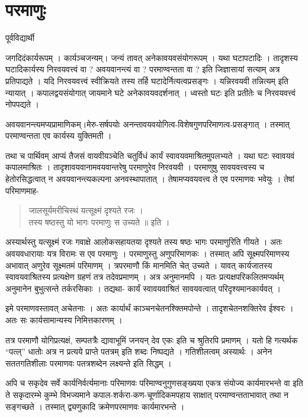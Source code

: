 {\fontsize{15}{17}\selectfont
\chapter{परमाणुः}

\begin{center}
\smallskip
पूर्वविद्यार्थी
\addrule
\end{center}
जगदिदंकार्यरूपम् । कार्यञ्चजन्यम्। जन्यं तावत् अनेकावयवसंयोगरूपम् । यथा घटापटादिः । तादृशस्य घटादिकार्यस्य निरवयवत्त्वं वा ? अवयवानन्त्यं वा ? परमाण्वन्तता वा ? इति जिज्ञासायां सत्याम् अत्र प्रतिपाद्यते । यदि निरवयवत्त्वं स्वीक्रियते तस्य तर्हि घटादेर्नित्यत्वप्रसङ्गः । यन्निरवयवी तन्नित्यम् इति न्यायात् । कपालद्वयसंयोगात् जायमाने घटे अनेकावयवदर्शनात् । ध्वस्तो घटः इति प्रतीतेः च निरवयवत्त्वं नोपपद्यते ।

अवयवानन्त्यमप्यप्रामाणिकम्।मेरु-सर्षपयोः अनन्तावयवयोगित्व-विशेषगुणपरिमाणत्व-प्रसङ्गात् । तस्मात् परमाण्वन्तता एव कार्यस्य युक्तिमती ।

तथा च पार्थिवम् आप्यं तैजसं वायवीयञ्चेति चतुर्विधं कार्यं स्वावयवमाश्रितमुपलभ्यते । यथा घटः स्वावयवं कपालमाश्रितः । तादृशावयवानामवयवान्तरेषु परमाणुरेव निरवयवी । परमाणुषु सावयवत्त्वस्य च हेतोरसिद्धत्वात् न अवयवानन्त्यकल्पना अनवस्थापातात् । तेषामप्यवयवत्त्व ते एव परमाणवः भवेयुः । तेषां परिमाणमाह-
\begin{verse}
जालसूर्यमरीचिस्थं यत्सूक्ष्मं दृश्यते रजः ।\\
तस्य षष्ठस्तु यो भागः परमाणुः स उच्यते ॥ इति ।
\end{verse}
अस्यार्थस्तु यत्सूक्ष्मं रजः गवाक्षे आलोकसहायतया दृश्यते तस्य षष्ठः भागः परमाणुरिति गीयते । अतः अवयवधारायाः यत्र विरामः स एव परमाणुः । परमाणुस्तु अणुपरिमाणकः । तस्मात् अपि सूक्ष्मपरिमाणस्य अभावात् अणुरेव सूक्ष्मतमं परिमाणम् । त्रपरमाणौ किं मानमिति चेत् उच्यते । यावत् कार्यजातस्य स्वावयवाश्रितस्य प्रत्यक्षेण ग्रहणं तत्र तदेवप्रमाणम् । अत्र अनुमानमपि । यतः प्रत्यक्षपरिकलितमप्यर्थम् अनुमानेन बुभुत्सन्ते तर्करसिकाः । तद्यथा- कार्यं स्वावयवाश्रितं सावयवत्वात् परिदृश्यमानकार्यवत् ।

इमे परमाणवस्तावत् अचेतनाः । अतः कार्यार्थं काञ्चनचेतनश्क्तिमपोन्ते । तादृशचेतनशक्तिरेव ईश्वरः । अतः सः कार्यसामान्यस्य निमित्तकारणम् ।

तत्र परमाणौ योगिप्रत्यक्षं, सम्पतत्रैः द्यावाभूमिं जनयन् देव एकः इति च श्रुतिरपि प्रमाणम् । यतो हि गत्यर्थक “पत्ल्” धातोः अत्र न प्रत्यये प्राप्ते पतत्रम् इति शब्दः निष्पद्यते । गतिशीलत्वम् अस्यार्थः । अनेन सततगतिशीलाः परमाणवः पतत्रशब्देन लक्ष्यन्ते इति सिद्धम् ।

अपि च सकृदेव सर्वे कार्यनिर्वर्त्यमानाः परिमाणवः परिमाण्वनुगुणसङ्ख्यया एकत्र संयोज्य कार्यमारभन्ते वा इति ते सकृदारम्भे कुम्भे विभज्यमाने कपाल-शर्करा-कण-चूर्णादिकमपहाय साक्षात् परमाण्वन्तताभावात् तथा न सङ्गच्छते । तस्मात् द्व्यणुकादि क्रमेणपरमाणवः कार्यमारभन्ते । 

}
